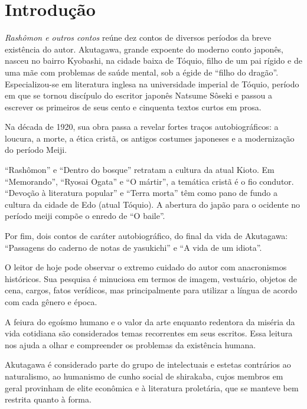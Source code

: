 \documentclass[12pt]{extarticle}
\begin{document}
\tableofcontents

\section{Introdução}

\textit{Rashômon e outros contos} reúne dez contos de diversos períodos da
breve existência do autor. Akutagawa, grande expoente do moderno conto japonês,
nasceu no bairro Kyobashi, na cidade baixa de Tóquio, filho de um pai rígido e
de uma mãe com problemas de saúde mental, sob a égide de “filho do dragão''.
Especializou-se em literatura inglesa na universidade imperial de Tóquio,
período em que se tornou discípulo do escritor japonês Natsume Sôseki e passou
a escrever os primeiros de seus cento e cinquenta textos curtos em prosa.
 
Na década de 1920, sua obra passa a revelar fortes traços autobiográficos: a
loucura, a morte, a ética cristã, os antigos costumes japoneses e a
modernização do período Meiji. 

“Rashômon” e “Dentro do bosque” retratam a cultura da atual Kioto. Em
“Memorando”, “Ryosai Ogata'' e “O mártir”, a temática cristã é o fio condutor.
“Devoção à literatura popular” e “Terra morta” têm como pano de fundo a cultura
da cidade de Edo (atual Tóquio). A abertura do japão para o ocidente no período
meiji compõe o enredo de “O baile”.
 
Por fim, dois contos de caráter autobiográfico, do final da vida de Akutagawa:
“Passagens do caderno de notas de yasukichi” e “A vida de um idiota”.

O leitor de hoje pode observar o extremo cuidado do autor com anacronismos
históricos. Sua pesquisa é minuciosa em termos de imagem, vestuário, objetos de
cena, cargos, fatos verídicos, mas principalmente para utilizar a língua de
acordo com cada gênero e época.

A feiura do egoísmo humano e o valor da arte enquanto redentora da miséria da
vida cotidiana são considerados temas recorrentes em seus escritos.  Essa
leitura nos ajuda a olhar e compreender os problemas da existência humana.
 
Akutagawa é considerado parte do grupo de intelectuais e estetas contrários ao
naturalismo, ao humanismo de cunho social de shirakaba, cujos membros em geral
provinham de elite econômica e à literatura proletária, que se manteve bem
restrita quanto à forma.
 
\end{document}
